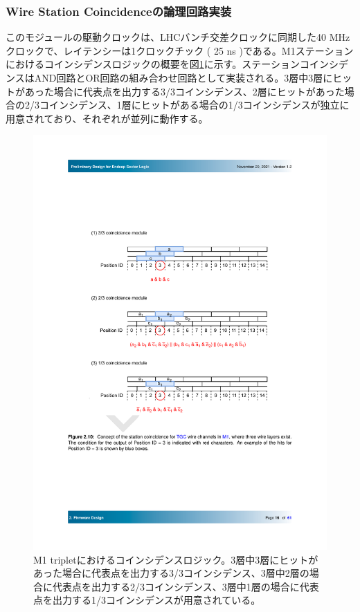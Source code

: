 \subsubsection*{Wire Station Coincidenceの論理回路実装}
このモジュールの駆動クロックは、LHCバンチ交差クロックに同期した40 MHzクロックで、レイテンシーは1クロックチック ( 25 ns )である。M1ステーションにおけるコインシデンスロジックの概要を図\ref{StationCoin_wire}に示す。ステーションコインシデンスはAND回路とOR回路の組み合わせ回路として実装される。3層中3層にヒットがあった場合に代表点を出力する3/3コインシデンス、2層にヒットがあった場合の2/3コインシデンス、1層にヒットがある場合の1/3コインシデンスが独立に用意されており、それぞれが並列に動作する。

\begin{figure} 
    \centering
    \includegraphics[width=16cm]{fig/SL/StationCoin_wire.pdf}
    \caption[M1 tripletにおけるコインシデンスロジック]{M1 tripletにおけるコインシデンスロジック\cite{SLPDR}。3層中3層にヒットがあった場合に代表点を出力する3/3コインシデンス、3層中2層の場合に代表点を出力する2/3コインシデンス、3層中1層の場合に代表点を出力する1/3コインシデンスが用意されている。}
    \label{StationCoin_wire}
\end{figure}

